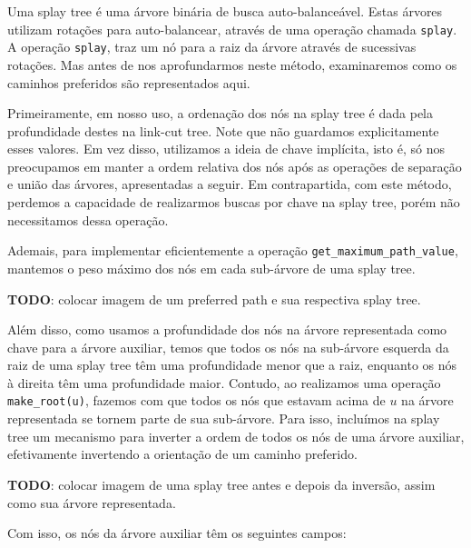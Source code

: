 Uma splay tree é uma árvore binária de busca auto-balanceável. Estas árvores utilizam rotações para auto-balancear, através de uma operação chamada \texttt{splay}. A operação \texttt{splay}, traz um nó para a raiz da árvore através de sucessivas rotações. Mas antes de nos aprofundarmos neste método, examinaremos como os caminhos preferidos são representados aqui.

Primeiramente, em nosso uso, a ordenação dos nós na splay tree é dada pela profundidade destes na link-cut tree. Note que não guardamos explicitamente esses valores. Em vez disso, utilizamos a ideia de chave implícita, isto é, só nos preocupamos em manter a ordem relativa dos nós após as operações de separação e união das árvores, apresentadas a seguir. Em contrapartida, com este método, perdemos a capacidade de realizarmos buscas por chave na splay tree, porém não necessitamos dessa operação.

Ademais, para implementar eficientemente a operação \texttt{get\_maximum\_path\_value}, mantemos o peso máximo dos nós em cada sub-árvore de uma splay tree.

\begin{center}
    \textbf{TODO}: colocar imagem de um preferred path e sua respectiva splay tree.
\end{center}

Além disso, como usamos a profundidade dos nós na árvore representada como chave para a árvore auxiliar, temos que todos os nós na sub-árvore esquerda da raiz de uma splay tree têm uma profundidade menor que a raiz, enquanto os nós à direita têm uma profundidade maior. Contudo, ao realizamos uma operação \texttt{make\_root(u)}, fazemos com que todos os nós que estavam acima de $u$ na árvore representada se tornem parte de sua sub-árvore. Para isso, incluímos na splay tree um mecanismo para inverter a ordem de todos os nós de uma árvore auxiliar, efetivamente invertendo a orientação de um caminho preferido.

\begin{center}
    \textbf{TODO}: colocar imagem de uma splay tree antes e depois da inversão, assim como sua árvore representada.
\end{center}

Com isso, os nós da árvore auxiliar têm os seguintes campos:

